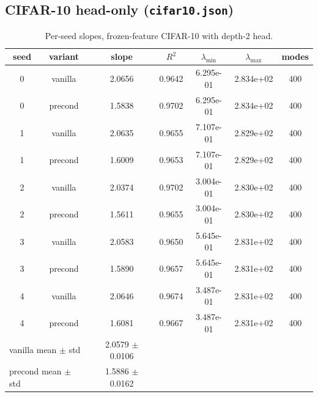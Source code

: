 \subsection{CIFAR-10 head-only (\texttt{cifar10.json})}
\begin{table}[H]
\centering
\caption{Per-seed slopes, frozen-feature CIFAR-10 with depth-2 head.}
\label{tab:precond-cifar10}
\begin{tabular}{c c c c c c c}
\toprule
seed & variant & slope & $R^2$ & $\lambda_{\min}$ & $\lambda_{\max}$ & modes \\
\midrule
0 & vanilla & 2.0656 & 0.9642 & 6.295e-01 & 2.834e+02 & 400 \\
0 & precond & 1.5838 & 0.9702 & 6.295e-01 & 2.834e+02 & 400 \\
1 & vanilla & 2.0635 & 0.9655 & 7.107e-01 & 2.829e+02 & 400 \\
1 & precond & 1.6009 & 0.9653 & 7.107e-01 & 2.829e+02 & 400 \\
2 & vanilla & 2.0374 & 0.9702 & 3.004e-01 & 2.830e+02 & 400 \\
2 & precond & 1.5611 & 0.9655 & 3.004e-01 & 2.830e+02 & 400 \\
3 & vanilla & 2.0583 & 0.9650 & 5.645e-01 & 2.831e+02 & 400 \\
3 & precond & 1.5890 & 0.9657 & 5.645e-01 & 2.831e+02 & 400 \\
4 & vanilla & 2.0646 & 0.9674 & 3.487e-01 & 2.831e+02 & 400 \\
4 & precond & 1.6081 & 0.9667 & 3.487e-01 & 2.831e+02 & 400 \\
\midrule
\multicolumn{2}{l}{vanilla mean $\pm$ std} & 2.0579 $\pm$ 0.0106 & & & & \\
\multicolumn{2}{l}{precond mean $\pm$ std} & 1.5886 $\pm$ 0.0162 & & & & \\
\bottomrule
\end{tabular}
\end{table}

